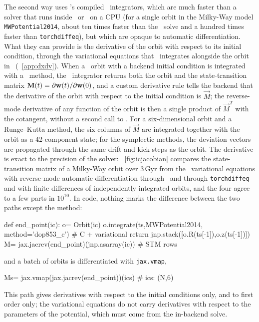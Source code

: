 The second way uses \galpy's compiled \cc\ integrators, which are much
faster than a solver that runs inside \jax\ or \torch\ on a CPU (for a
single orbit in the Milky-Way model \texttt{MWPotential2014}, 
about ten times faster than the
\diffrax\ solve and a hundred times faster than \texttt{torchdiffeq}),
but which are opaque to automatic differentiation. What they can provide is the derivative of the
orbit with respect to its initial condition, through the variational
equations that \galpy\ integrates alongside the orbit in \cc\
(\appendixname~\ref{app:dxdv}). When a \galpy\ orbit with a backend
initial condition is integrated with a \cc\ method, the \cc\ integrator
returns both the orbit and the state-transition matrix
$\mathbf{M}(t) = \partial \mathbf{w}(t)/\partial \mathbf{w}(0)$, and a custom
derivative rule tells the backend that the derivative of the orbit with
respect to the initial condition is $\vec{M}$; the reverse-mode
derivative of any function of the orbit is then a single product of
$\vec{M}^T$ with the cotangent, without a second call to \cc. For a
six-dimensional orbit and a Runge--Kutta method, the six columns of
$\vec{M}$ are integrated together with the orbit as a 42-component
state; for the symplectic methods, the deviation vectors are propagated
through the same drift and kick steps as the orbit. The derivative is
exact to the precision of the solver: \figurename~\ref{fig:icjacobian}
compares the state-transition matrix of a Milky-Way orbit over 3\,Gyr
from the \cc\ variational equations with reverse-mode automatic
differentiation through
\diffrax\ and through \texttt{torchdiffeq} and with finite differences
of independently integrated orbits, and the four agree to a few parts in
$10^{10}$. In code, nothing marks the difference between the two paths except the
method:
\begin{code}
def end_point(ic):
    o= Orbit(ic)
    o.integrate(ts,MWPotential2014,
                method='dop853_c') # C + variational
    return jnp.stack([o.R(ts[-1]),o.z(ts[-1])])
M= jax.jacrev(end_point)(jnp.asarray(ic)) # STM rows
\end{code}
and a batch of orbits is differentiated with \texttt{jax.vmap},
\begin{code}
Ms= jax.vmap(jax.jacrev(end_point))(ics) # ics: (N,6)
\end{code}
This path gives derivatives with respect to the initial
conditions only, and to first order only; the variational equations do
not carry derivatives with respect to the parameters of the potential,
which must come from the in-backend solve.


